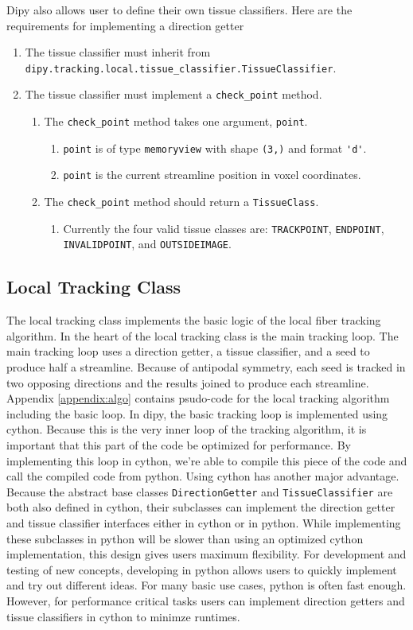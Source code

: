     Dipy also allows user to define their own tissue classifiers. Here are the requirements for implementing a direction getter
\begin{enumerate}
\item The tissue classifier must inherit from \verb|dipy.tracking.local.tissue_classifier.TissueClassifier|.
\item The tissue classifier must implement a \verb|check_point| method.
\begin{enumerate}
\item The \verb|check_point| method takes one argument, \verb|point|.
\begin{enumerate}
\item \verb|point| is of type \verb|memoryview| with shape \verb|(3,)| and format \verb|'d'|.
\item \verb|point| is the current streamline position in voxel coordinates.
\end{enumerate}
\item The \verb|check_point| method should return a \verb|TissueClass|.
\begin{enumerate}
\item Currently the four valid tissue classes are:  \verb|TRACKPOINT|, \verb|ENDPOINT|, \verb|INVALIDPOINT|, and \verb|OUTSIDEIMAGE|.
\end{enumerate}
\end{enumerate}
\end{enumerate}

\subsection{Local Tracking Class}
    The local tracking class implements the basic logic of the local fiber tracking algorithm. In the heart of the local tracking class is the main tracking loop. The main tracking loop uses a direction getter, a tissue classifier, and a seed to produce half a streamline. Because of antipodal symmetry, each seed is tracked in two opposing directions and the results joined to produce each streamline. Appendix \ref{appendix:algo} contains psudo-code for the local tracking algorithm including the basic loop. In dipy, the basic tracking loop is implemented using cython. Because this is the very inner loop of the tracking algorithm, it is important that this part of the code be optimized for performance. By implementing this loop in cython, we're able to compile this piece of the code and call the compiled code from python. Using cython has another major advantage. Because the abstract base classes \verb|DirectionGetter| and \verb|TissueClassifier| are both also defined in cython, their subclasses can implement the direction getter and tissue classifier interfaces either in cython or in python. While implementing these subclasses in python will be slower than using an optimized cython implementation, this design gives users maximum flexibility. For development and testing of new concepts, developing in python allows users to quickly implement and try out different ideas. For many basic use cases, python is often fast enough. However, for performance critical tasks users can implement direction getters and tissue classifiers in cython to minimze runtimes.